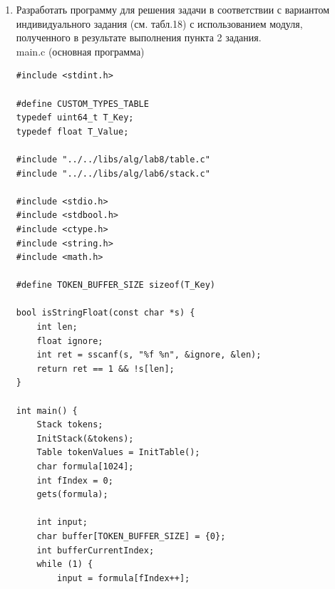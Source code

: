 \documentclass[a4paper,14pt]{extarticle}
\begin{document}
\begin{enumerate}
\begin{verbatim}
    return false;
}

bool ReadTable(Table *T, BaseType *E, T_Key Key) {
    TableError = TableOk;
    BeginPtr(T);
    while (!EndList(T) && T->ptr->next->data.Key < Key)
        MovePtr(T);
    
    if (EndList(T)) return false;

    if (T->ptr->next->data.Key == Key) {
        ReadList(T, E);

        return true;
    }

    return false;
}

bool WriteTable(Table *T, BaseType E) {
    TableError = TableOk;
    BeginPtr(T);
    while (!EndList(T) && T->ptr->next->data.Key < E.Key)
        MovePtr(T);
    
    if (EndList(T)) return false;

    if (T->ptr->next->data.Key == E.Key) {
        MovePtr(T);
        T->ptr->data = E;

        return true;
    }

    return false;
}

void DoneTable(Table *T) {
    TableError = TableOk;
    DoneList(T);
}
\end{verbatim}
\item Разработать программу для решения задачи в соответствии с вариантом
индивидуального задания (см. табл.18) с использованием модуля, полученного
в результате выполнения пункта 2 задания.\\
main.c (основная программа)
\begin{verbatim}
#include <stdint.h>

#define CUSTOM_TYPES_TABLE
typedef uint64_t T_Key;
typedef float T_Value;

#include "../../libs/alg/lab8/table.c"
#include "../../libs/alg/lab6/stack.c"

#include <stdio.h>
#include <stdbool.h>
#include <ctype.h>
#include <string.h>
#include <math.h>

#define TOKEN_BUFFER_SIZE sizeof(T_Key)

bool isStringFloat(const char *s) {
    int len;
    float ignore;
    int ret = sscanf(s, "%f %n", &ignore, &len);
    return ret == 1 && !s[len];
}

int main() {
    Stack tokens;
    InitStack(&tokens);
    Table tokenValues = InitTable();
    char formula[1024];
    int fIndex = 0;
    gets(formula);

    int input;
    char buffer[TOKEN_BUFFER_SIZE] = {0};
    int bufferCurrentIndex;
    while (1) {
        input = formula[fIndex++];


\end{verbatim}
\end{enumerate}
\end{document}
